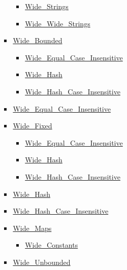 \begin{scriptsize}
\begin{multicols*}{\columnnr}
\begin{itemize}[leftmargin=0mm]
\begin{itemize}[leftmargin=5mm]
\begin{itemize}[leftmargin=5mm]
\begin{itemize}[leftmargin=5mm]
	  \item[] \href{http://www.ada-auth.org/standards/22rm/html/RM-A-4-11.html}{Wide\_Strings}
	  \item[] \href{http://www.ada-auth.org/standards/22rm/html/RM-A-4-11.html}{Wide\_Wide\_Strings}
	  \end{itemize}
	\item[] \href{http://www.ada-auth.org/standards/22rm/html/RM-A-4-7.html}{Wide\_Bounded}
	  \begin{itemize}[leftmargin=5mm]
	  \item[] \href{http://www.ada-auth.org/standards/22rm/html/RM-A-4-7.html}{Wide\_Equal\_Case\_Insensitive}
	  \item[] \href{http://www.ada-auth.org/standards/22rm/html/RM-A-4-7.html}{Wide\_Hash}
	  \item[] \href{http://www.ada-auth.org/standards/22rm/html/RM-A-4-7.html}{Wide\_Hash\_Case\_Insensitive}
	  \end{itemize}
	\item[] \href{http://www.ada-auth.org/standards/22rm/html/RM-A-4-7.html}{Wide\_Equal\_Case\_Insensitive}
	\item[] \href{http://www.ada-auth.org/standards/22rm/html/RM-A-4-7.html}{Wide\_Fixed}
	  \begin{itemize}[leftmargin=5mm]
	  \item[] \href{http://www.ada-auth.org/standards/22rm/html/RM-A-4-7.html}{Wide\_Equal\_Case\_Insensitive}
	  \item[] \href{http://www.ada-auth.org/standards/22rm/html/RM-A-4-7.html}{Wide\_Hash}
	  \item[] \href{http://www.ada-auth.org/standards/22rm/html/RM-A-4-7.html}{Wide\_Hash\_Case\_Insensitive}
	  \end{itemize}
	\item[] \href{http://www.ada-auth.org/standards/22rm/html/RM-A-4-7.html}{Wide\_Hash}
	\item[] \href{http://www.ada-auth.org/standards/22rm/html/RM-A-4-7.html}{Wide\_Hash\_Case\_Insensitive}
	\item[] \href{http://www.ada-auth.org/standards/22rm/html/RM-A-4-7.html}{Wide\_Maps}
	  \begin{itemize}[leftmargin=5mm]
	  \item[] \href{http://www.ada-auth.org/standards/22rm/html/RM-A-4-7.html}{Wide\_Constants}
	  \end{itemize}
	\item[] \href{http://www.ada-auth.org/standards/22rm/html/RM-A-4-7.html}{Wide\_Unbounded}

\end{itemize}
\end{itemize}
\end{itemize}
\end{multicols*}
\end{scriptsize}
